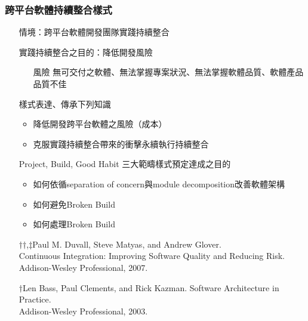 \documentclass[utf8x]{beamer}
\begin{document}
\begin{frame}
\frametitle{跨平台軟體持續整合樣式}
\begin{itemize}
\setlength{\itemindent}{1em}
\item[] 情境：跨平台軟體開發團隊實踐持續整合
\item[] 實踐持續整合之目的：降低開發風險
\begin{itemize}
\setlength{\itemindent}{3em}
\item[風險] 無可交付之軟體、無法掌握專案狀況、無法掌握軟體品質、軟體產品品質不佳\ddag
\end{itemize}
\item[] 樣式表達、傳承下列知識
\begin{itemize}
\item 降低開發跨平台軟體之風險（成本）
\item 克服實踐持續整合帶來的衝擊永續執行持續整合
\end{itemize}
\item[] Project, Build, Good Habit 三大範疇樣式預定達成之目的
\begin{itemize}
\item 如何依循separation of concern與module decomposition改善軟體架構\dag%
\item 如何避免Broken Build\dag\dag%
\item 如何處理Broken Build%
\end{itemize}
\fontsize{6pt}{4pt}\selectfont
\item[] $\dag$$\dag$,$\ddag$Paul M. Duvall, Steve Matyas, and Andrew Glover.\\Continuous Integration: Improving Software Quality and Reducing Risk.\\Addison-Wesley Professional, 2007.
\item[] $\dag$Len Bass, Paul Clements, and Rick Kazman. Software Architecture in Practice.
\\Addison-Wesley Professional, 2003.
\end{itemize}
\end{frame}

\end{document}
